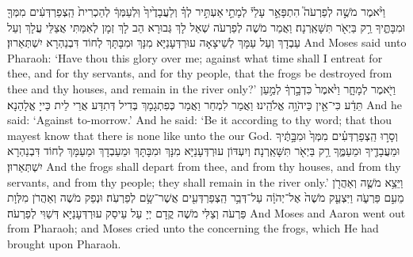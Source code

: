 {וַיֹּ֨אמֶר מֹשֶׁ֣ה לְפַרְעֹה֮ הִתְפָּאֵ֣ר עָלַי֒ לְמָתַ֣י \legarmeh  אַעְתִּ֣יר לְךָ֗ וְלַעֲבָדֶ֙יךָ֙ וּֽלְעַמְּךָ֔ לְהַכְרִית֙ הַֽצְפַרְדְּעִ֔ים מִמְּךָ֖ וּמִבָּתֶּ֑יךָ רַ֥ק בַּיְאֹ֖ר תִּשָּׁאַֽרְנָה׃
}
{וַאֲמַר מֹשֶׁה לְפַרְעֹה שְׁאַל לָךְ גְּבוּרָא הַב לָךְ זְמָן לְאִמַּתִּי אֲצַלֵּי עֲלָךְ וְעַל עַבְדָךְ וְעַל עַמָּךְ לְשֵׁיצָאָה עוּרְדְּעָנַיָּא מִנָּךְ וּמִבָּתָּךְ לְחוֹד דִּבְנַהְרָא יִשְׁתְּאַרוּן׃}
{And Moses said unto Pharaoh: ‘Have thou this glory over me; against what time shall I entreat for thee, and for thy servants, and for thy people, that the frogs be destroyed from thee and thy houses, and remain in the river only?’}{}
{וַיֹּ֖אמֶר לְמָחָ֑ר וַיֹּ֙אמֶר֙ כִּדְבָ֣רְךָ֔ לְמַ֣עַן תֵּדַ֔ע כִּי־אֵ֖ין כַּיהֹוָ֥ה אֱלֹהֵֽינוּ׃
}
{וַאֲמַר לִמְחַר וַאֲמַר כְּפִתְגָמָךְ בְּדִיל דְּתִדַּע אֲרֵי לֵית כַּייָ אֱלָהַנָא׃}
{And he said: ‘Against to-morrow.’ And he said: ‘Be it according to thy word; that thou mayest know that there is none like unto the \lord\space our God.}{}
{וְסָר֣וּ הַֽצְפַרְדְּעִ֗ים מִמְּךָ֙ וּמִבָּ֣תֶּ֔יךָ וּמֵעֲבָדֶ֖יךָ וּמֵעַמֶּ֑ךָ רַ֥ק בַּיְאֹ֖ר תִּשָּׁאַֽרְנָה׃}
{וְיִעְדּוֹן עוּרְדְּעָנַיָּא מִנָּךְ וּמִבָּתָּךְ וּמֵעַבְדָךְ וּמֵעַמָּךְ לְחוֹד דִּבְנַהְרָא יִשְׁתְּאַרוּן׃}
{And the frogs shall depart from thee, and from thy houses, and from thy servants, and from thy people; they shall remain in the river only.’}{}
{וַיֵּצֵ֥א מֹשֶׁ֛ה וְאַהֲרֹ֖ן מֵעִ֣ם פַּרְעֹ֑ה וַיִּצְעַ֤ק מֹשֶׁה֙ אֶל־יְהֹוָ֔ה עַל־דְּבַ֥ר הַֽצְפַרְדְּעִ֖ים אֲשֶׁר־שָׂ֥ם לְפַרְעֹֽה׃
}
{וּנְפַק מֹשֶׁה וְאַהֲרֹן מִלְּוָת פַּרְעֹה וְצַלִּי מֹשֶׁה קֳדָם יְיָ עַל עֵיסַק עוּרְדְּעָנַיָּא דְּשַׁוִּי לְפַרְעֹה׃}
{And Moses and Aaron went out from Pharaoh; and Moses cried unto the \lord\space concerning the frogs, which He had brought upon Pharaoh.}{}
